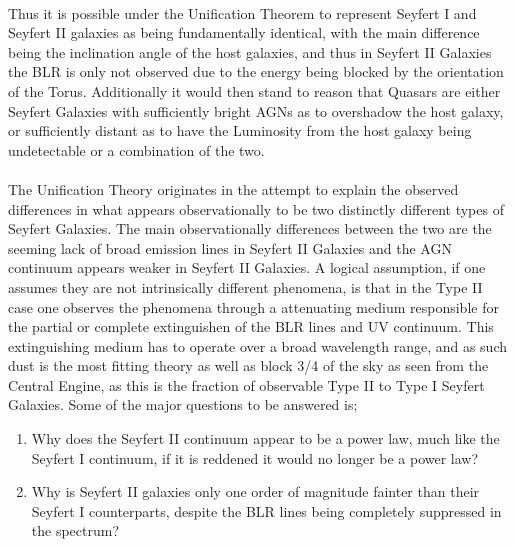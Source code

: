 \documentclass[a4paper, 12pt, twoside]{article}
\begin{document}
\\
Thus it is possible under the Unification Theorem to represent Seyfert I and Seyfert II galaxies as being fundamentally identical, with the main difference being the inclination angle of the host galaxies, and thus in Seyfert II Galaxies the BLR is only not observed due to the energy being blocked by the orientation of the Torus. Additionally it would then stand to reason that Quasars are either Seyfert Galaxies with sufficiently bright AGNs as to overshadow the host galaxy, or sufficiently distant as to have the Luminosity from the host galaxy being undetectable or a combination of the two. \\
\\
The Unification Theory originates in the attempt to explain the observed differences in what appears observationally to be two distinctly different types of Seyfert Galaxies. The main observationally differences between the two are the seeming lack of broad emission lines in Seyfert II Galaxies and the AGN continuum appears weaker in Seyfert II Galaxies. A logical assumption, if one assumes they are not intrinsically different phenomena, is that in the Type II case one observes the phenomena through a attenuating medium responsible for the partial or complete extinguishen of the BLR lines and UV continuum. This extinguishing medium has to operate over a broad wavelength range, and as such dust is the most fitting theory as well as block 3/4 of the sky as seen from the Central Engine, as this is the fraction of observable Type II to Type I Seyfert Galaxies. Some of the major questions to be answered is;
\begin{enumerate}
\item Why does the Seyfert II continuum appear to be a power law, much like the Seyfert I continuum, if it is reddened it would no longer be a power law?
\item Why is Seyfert II galaxies only one order of magnitude fainter than their Seyfert I counterparts, despite the BLR lines being completely suppressed in the spectrum?
\end{enumerate}
\end{document}
